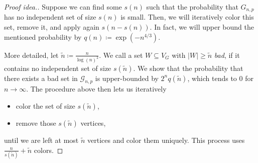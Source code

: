 \begin{proof}[Proof idea.]
    Suppose we can find some $s(n)$ such that the probability that ${G}_{n,p}$ has no independent set of size $s(n)$ is small.
    Then, we will iteratively color this set, remove it, and apply again $s(n - s(n))$.
    In fact, we will upper bound the mentioned probability by $q(n) \coloneqq \exp(-n^{4/3})$.

    More detailed, let $\tilde n \coloneqq \frac{n}{\log(n)^2}$.
    We call a set $W \subseteq V_G$ with $|W| \geq \tilde n$ \emph{bad},
    if it contains no independent set of size $s(\tilde n)$.
    We show that the probability that there exists a bad set in $\mathcal{G}_{n,p}$
    is upper-bounded by $2^n q(\tilde n)$, which tends to 0 for $n \rightarrow \infty$.
    The procedure above then lets us iteratively
    \begin{itemize}
        \item color the set of size $s(\tilde n)$,
        \item remove those $s(\tilde n)$ vertices,
    \end{itemize}
    until we are left at most $\tilde n$ vertices and color them uniquely.
    This process uses $\frac{n}{s(\tilde n)}+\tilde n$ colors.
\end{proof}
